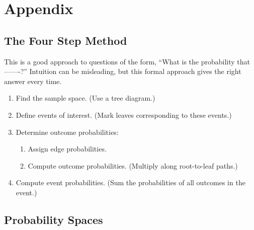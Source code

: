 \documentclass[handout]{mcs}
\begin{document}






\section{Appendix}

\subsection{The Four Step Method}

This is a good approach to questions of the form, ``What is the
probability that -------?''  Intuition can be misleading, but
this formal approach gives the right answer every time.

\begin{enumerate}
\item Find the sample space.  (Use a tree diagram.)

\item Define events of interest.  (Mark leaves corresponding to these
events.)

\item Determine outcome probabilities:

\begin{enumerate}

\item Assign edge probabilities.

\item Compute outcome probabilities.  (Multiply along root-to-leaf
paths.)

\end{enumerate}

\item Compute event probabilities.  (Sum the probabilities of all
outcomes in the event.)

\end{enumerate}

\subsection{Probability Spaces}
\end{document}
